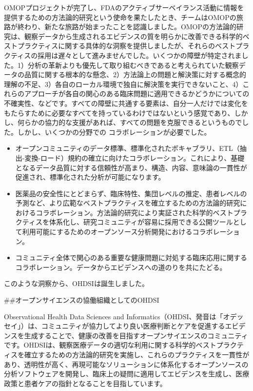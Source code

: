 \documentclass[
  11pt]{book}
\providecommand{\tightlist}{%
  \setlength{\itemsep}{0pt}\setlength{\parskip}{0pt}}
\theoremstyle{definition}
\theoremstyle{definition}
\theoremstyle{definition}
\theoremstyle{definition}
\theoremstyle{remark}
\begin{document}
OMOPプロジェクトが完了し、FDAのアクティブサーベイランス活動に情報を提供するための方法論的研究という使命を果たしたとき、チームはOMOPの旅路が終わり、新たな旅路が始まったことを認識しました。OMOPの方法論的研究は、観察データから生成されるエビデンスの質を明らかに改善できる科学的ベストプラクティスに関する具体的な洞察を提供しましたが、それらのベストプラクティスの採用は遅々として進みませんでした。いくつかの障壁が特定されました。1）分析の革新よりも優先して取り組むべきであると考えられていた観察データの品質に関する根本的な懸念、2）方法論上の問題と解決策に対する概念的理解の不足、3）各自のローカル環境で独自に解決策を実行できないこと、4）これらのアプローチが各自の関心のある臨床問題に適用できるかどうかについての不確実性、などです。すべての障壁に共通する要素は、自分一人だけでは変化をもたらすために必要なすべてを持っているわけではないという感覚であり、しかし、何らかの協力的な支援があれば、すべての問題を克服できるというものでした。しかし、いくつかの分野での コラボレーションが必要でした。

\begin{itemize}
\tightlist
\item
  オープンコミュニティのデータ標準、標準化されたボキャブラリ、ETL（抽出-変換-ロード）規約の確立に向けたコラボレーション。これにより、基礎となるデータ品質に対する信頼性が高まり、構造、内容、意味論の一貫性が促進され、標準化された分析が可能になります。
\item
  医薬品の安全性にとどまらず、臨床特性、集団レベルの推定、患者レベルの予測など、より広範なベストプラクティスを確立するための方法論的研究におけるコラボレーション。方法論的研究により実証された科学的ベストプラクティスを体系化し、研究コミュニティが容易に採用できる公開ツールとして利用可能にするためのオープンソース分析開発におけるコラボレーション。
\item
  コミュニティ全体で関心のある重要な健康問題に対処する臨床応用に関するコラボレーション。データからエビデンスへの道のりを共にたどる。
\end{itemize}

このような洞察から、OHDSIは誕生しました。

\#\#オープンサイエンスの協働組織としてのOHDSI

Observational Health Data Sciences and Informatics（OHDSI、発音は「オデッセイ」）は、コミュニティが協力してより良い医療判断とケアを促進するエビデンスを生成することで、健康の改善を目指すオープンサイエンスのコミュニティです\citep{Hripcsak2015}。OHDSIは、観察医療データの適切な利用に関する科学的ベストプラクティスを確立するための方法論的研究を実施し、これらのプラクティスを一貫性があり、透明性が高く、再現可能なソリューションに体系化するオープンソースの分析ソフトウェアを開発し、臨床上の疑問に適用してエビデンスを生成し、医療政策と患者ケアの指針となることを目指しています。
\end{document}
